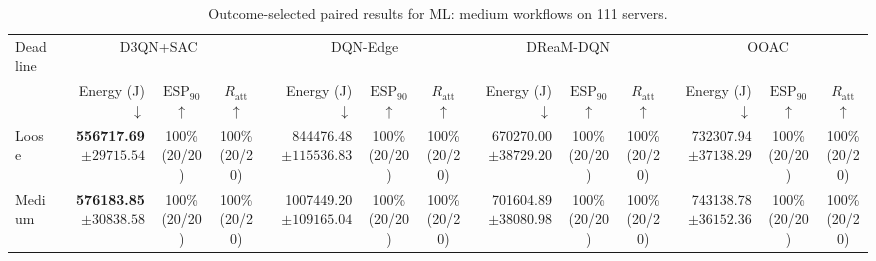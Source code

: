 \documentclass[10pt]{article}
\begin{document}
\begin{table}[!htbp]
\centering
\caption{Outcome-selected paired results for ML: medium workflows on 111 servers.}
\label{tab:conditional_case_ml}
\begingroup
\footnotesize
\setlength{\tabcolsep}{2.2pt}
\renewcommand{\arraystretch}{1.08}
\begin{tabular}{@{}l*{4}{rcc}@{}}
\toprule
Deadline & \multicolumn{3}{c}{D3QN+SAC} & \multicolumn{3}{c}{DQN-Edge} & \multicolumn{3}{c}{DReaM-DQN} & \multicolumn{3}{c}{OOAC} \\
\cmidrule(lr){2-4}\cmidrule(lr){5-7}\cmidrule(lr){8-10}\cmidrule(lr){11-13}
 & Energy (J) $\downarrow$ & $\mathrm{ESP}_{90}$ $\uparrow$ & $R_{\mathrm{att}}$ $\uparrow$ & Energy (J) $\downarrow$ & $\mathrm{ESP}_{90}$ $\uparrow$ & $R_{\mathrm{att}}$ $\uparrow$ & Energy (J) $\downarrow$ & $\mathrm{ESP}_{90}$ $\uparrow$ & $R_{\mathrm{att}}$ $\uparrow$ & Energy (J) $\downarrow$ & $\mathrm{ESP}_{90}$ $\uparrow$ & $R_{\mathrm{att}}$ $\uparrow$ \\
\midrule
Loose & \shortstack[r]{\textbf{556717.69}\\$\pm 29715.54$} & \shortstack[c]{100\%\\(20/20)} & \shortstack[c]{100\%\\(20/20)} & \shortstack[r]{844476.48\\$\pm 115536.83$} & \shortstack[c]{100\%\\(20/20)} & \shortstack[c]{100\%\\(20/20)} & \shortstack[r]{670270.00\\$\pm 38729.20$} & \shortstack[c]{100\%\\(20/20)} & \shortstack[c]{100\%\\(20/20)} & \shortstack[r]{732307.94\\$\pm 37138.29$} & \shortstack[c]{100\%\\(20/20)} & \shortstack[c]{100\%\\(20/20)} \\
Medium & \shortstack[r]{\textbf{576183.85}\\$\pm 30838.58$} & \shortstack[c]{100\%\\(20/20)} & \shortstack[c]{100\%\\(20/20)} & \shortstack[r]{1007449.20\\$\pm 109165.04$} & \shortstack[c]{100\%\\(20/20)} & \shortstack[c]{100\%\\(20/20)} & \shortstack[r]{701604.89\\$\pm 38080.98$} & \shortstack[c]{100\%\\(20/20)} & \shortstack[c]{100\%\\(20/20)} & \shortstack[r]{743138.78\\$\pm 36152.36$} & \shortstack[c]{100\%\\(20/20)} & \shortstack[c]{100\%\\(20/20)} \\

\end{tabular}
\end{table}
\end{document}
